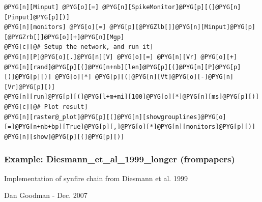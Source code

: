 \documentclass[letterpaper,10pt,english]{manual}
\begin{document}
\begin{Verbatim}[commandchars=@\[\]]
@PYG[n][Minput] @PYG[o][=] @PYG[n][SpikeMonitor]@PYG[p][(]@PYG[n][Pinput]@PYG[p][)]
@PYG[n][monitors] @PYG[o][=] @PYG[p][@PYGZlb[]]@PYG[n][Minput]@PYG[p][@PYGZrb[]]@PYG[o][+]@PYG[n][Mgp]
@PYG[c][@# Setup the network, and run it]
@PYG[n][P]@PYG[o][.]@PYG[n][V] @PYG[o][=] @PYG[n][Vr] @PYG[o][+] @PYG[n][rand]@PYG[p][(]@PYG[n+nb][len]@PYG[p][(]@PYG[n][P]@PYG[p][)]@PYG[p][)] @PYG[o][*] @PYG[p][(]@PYG[n][Vt]@PYG[o][-]@PYG[n][Vr]@PYG[p][)]
@PYG[n][run]@PYG[p][(]@PYG[l+m+mi][100]@PYG[o][*]@PYG[n][ms]@PYG[p][)]
@PYG[c][@# Plot result]
@PYG[n][raster@_plot]@PYG[p][(]@PYG[n][showgrouplines]@PYG[o][=]@PYG[n+nb+bp][True]@PYG[p][,]@PYG[o][*]@PYG[n][monitors]@PYG[p][)]
@PYG[n][show]@PYG[p][(]@PYG[p][)]
\end{Verbatim}

\resetcurrentobjects
\hypertarget{--doc-examples-frompapers_Diesmann_et_al_1999_longer}{}

\hypertarget{index-29}{}\subsubsection{Example: Diesmann\_et\_al\_1999\_longer (frompapers)}

Implementation of synfire chain from Diesmann et al. 1999

Dan Goodman - Dec. 2007
\end{document}
